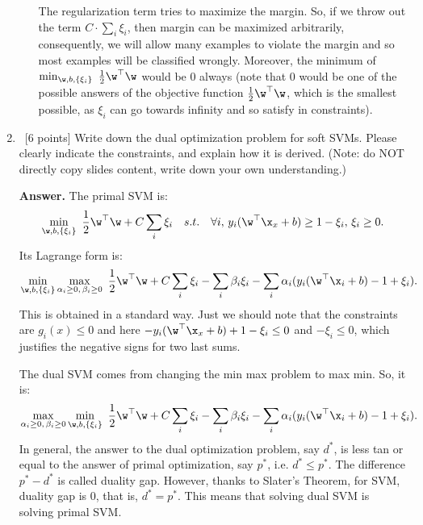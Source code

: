 \documentclass[12pt, fullpage,letterpaper]{article}
\begin{document}
\begin{enumerate}
\begin{enumerate}
The regularization term tries to maximize the margin. So, if we throw out the term $C\cdot\sum_i \xi_i $, then margin can be maximized arbitrarily, consequently, we will allow many examples to violate the margin and so most examples will be classified wrongly. Moreover, 
the minimum of $\min_{\w, b, \{\xi_i\}} \ \frac{1}{2} \w^\top \w$ would be 0 always (note that 0 would be one of the possible answers of the objective function $\frac{1}{2} \w^\top \w$, which is the smallest possible, as $\xi_i$ can go towards infinity and so satisfy in constraints).
	\end{enumerate}
	

	\item~[6 points] Write down the dual optimization problem for soft SVMs.  
	Please clearly indicate the constraints, and explain how it is derived. (Note: do NOT directly copy slides content, write down your own understanding.)
	
\item[{\bf Answer.}] The primal SVM is: 
$$\min_{\w, b, \{\xi_i\}} \ \frac{1}{2} \w^\top \w + C \sum_i \xi_i \quad s.t.  \quad \forall i, \,  y_i(\w^\top \x_x + b) \geq 1 - \xi_i, \, \xi_i \geq 0.$$
Its Lagrange form is:
$$\min_{\w, b, \{\xi_i\}} \max_{\alpha_i \geq 0, \, \beta_i \geq 0} \ \frac{1}{2} \w^\top \w + C \sum_i \xi_i - \sum_i \beta_i\xi_i -\sum_i \alpha_i (y_i(\w^\top \x_i + b) - 1 + \xi_i).$$
This is obtained in a standard way. Just we should note that the constraints are $g_i(x) \leq 0$ and here $-y_i(\w^\top \x_x + b)+ 1 - \xi_i \leq 0$ and $-\xi_i \leq 0$, which justifies the negative signs for two last sums. 

The dual SVM comes from changing the min max problem to max min. So, it is:
$$\max_{\alpha_i \geq 0, \, \beta_i \geq 0} \min_{\w, b, \{\xi_i\}} \ \frac{1}{2} \w^\top \w + C \sum_i \xi_i - \sum_i \beta_i\xi_i -\sum_i \alpha_i (y_i(\w^\top \x_i + b) - 1 + \xi_i).$$
In general, the answer to the dual optimization problem, say $d^*$, is less tan or equal to the answer of primal optimization, say $p^*$, i.e. $d^* \leq p^*$. The difference $p^* - d^*$ is called duality gap. However, thanks to Slater's Theorem, for SVM, duality gap is $0$, that is, $d^* = p^*$. This means that solving dual SVM is solving primal SVM. 


\end{enumerate}
\end{document}
